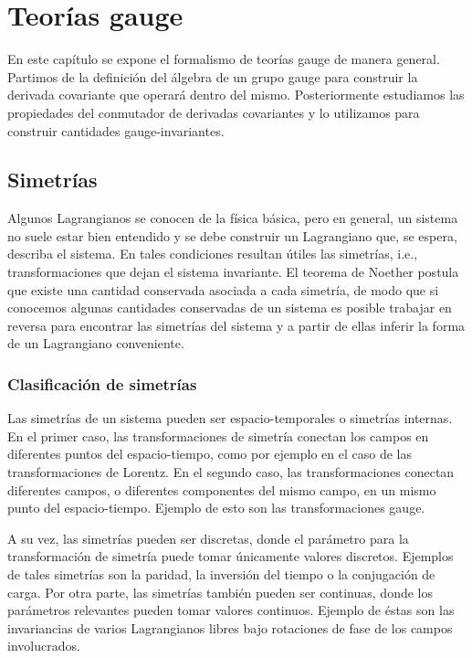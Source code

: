\chapter{Teorías gauge}
\label{ch:gauge}

En este capítulo se expone el formalismo de teorías gauge de manera general. Partimos de la definición del álgebra de un grupo gauge para construir la derivada covariante que operará dentro del mismo. Posteriormente estudiamos las propiedades del conmutador de derivadas covariantes y lo utilizamos para construir cantidades gauge-invariantes.





\section{Simetrías}

Algunos Lagrangianos se conocen de la física básica, pero en general, un sistema no suele estar bien entendido y se debe construir un Lagrangiano que, se espera, describa el sistema. En tales condiciones resultan útiles las simetrías, i.e., transformaciones que dejan el sistema invariante. El teorema de Noether postula que existe una cantidad conservada asociada a cada simetría, de modo que si conocemos algunas cantidades conservadas de un sistema es posible trabajar en reversa para encontrar las simetrías del sistema y a partir de ellas inferir la forma de un Lagrangiano conveniente.


\subsection{Clasificación de simetrías}

Las simetrías de un sistema pueden ser espacio-temporales o simetrías internas. En el primer caso, las transformaciones de simetría conectan los campos en diferentes puntos del espacio-tiempo, como por ejemplo en el caso de las transformaciones de Lorentz. En el segundo caso, las transformaciones conectan diferentes campos, o diferentes componentes del mismo campo, en un mismo punto del espacio-tiempo. Ejemplo de esto son las transformaciones gauge.

A su vez, las simetrías pueden ser discretas, donde el parámetro para la transformación de simetría puede tomar únicamente valores discretos. Ejemplos de tales simetrías son la paridad, la inversión del tiempo o la conjugación de carga. Por otra parte, las simetrías también pueden ser continuas, donde los parámetros relevantes pueden tomar valores continuos. Ejemplo de éstas son las invariancias de varios Lagrangianos libres bajo rotaciones de fase de los campos involucrados.

